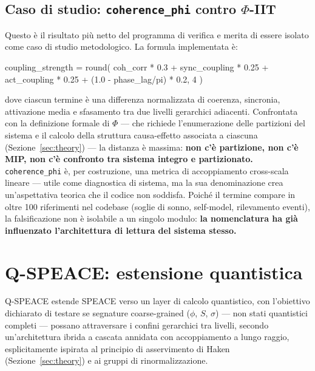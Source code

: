 \documentclass[11pt,a4paper]{article}
\newcommand{\code}[1]{\texttt{#1}}
\newcommand{\coherencephi}{\code{coherence\_phi}}
\begin{document}
\subsection{Caso di studio: \coherencephi{} contro $\Phi$-IIT}
\label{sec:coherence-phi}

Questo \`e il risultato pi\`u netto del programma di verifica e merita di essere isolato come caso di studio metodologico. La formula implementata \`e:

\begin{codeblock}
coupling_strength = round(
    coh_corr * 0.3 + sync_coupling * 0.25 +
    act_coupling * 0.25 + (1.0 - phase_lag/pi) * 0.2,
    4
)
\end{codeblock}

dove ciascun termine \`e una differenza normalizzata di coerenza, sincronia, attivazione media e sfasamento tra due livelli gerarchici adiacenti. Confrontata con la definizione formale di $\Phi$ --- che richiede l'enumerazione delle partizioni del sistema e il calcolo della struttura causa-effetto associata a ciascuna (Sezione~\ref{sec:theory}) --- la distanza \`e massima: \textbf{non c'\`e partizione, non c'\`e MIP, non c'\`e confronto tra sistema integro e partizionato.} \coherencephi{} \`e, per costruzione, una metrica di accoppiamento cross-scala lineare --- utile come diagnostica di sistema, ma la sua denominazione crea un'aspettativa teorica che il codice non soddisfa. Poich\'e il termine compare in oltre 100 riferimenti nel codebase (soglie di sonno, self-model, rilevamento eventi), la falsificazione non \`e isolabile a un singolo modulo: \textbf{la nomenclatura ha gi\`a influenzato l'architettura di lettura del sistema stesso.}

\section{Q-SPEACE: estensione quantistica}
\label{sec:qspeace}

Q-SPEACE estende SPEACE verso un layer di calcolo quantistico, con l'obiettivo dichiarato di testare se segnature coarse-grained ($\phi$, $S$, $\sigma$) --- non stati quantistici completi --- possano attraversare i confini gerarchici tra livelli, secondo un'architettura ibrida a cascata annidata con accoppiamento a lungo raggio, esplicitamente ispirata al principio di asservimento di Haken (Sezione~\ref{sec:theory}) e ai gruppi di rinormalizzazione.
\end{document}
